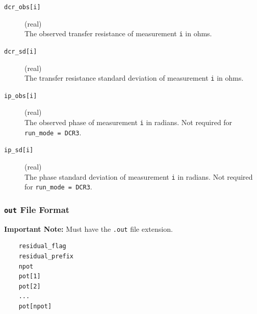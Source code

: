 \documentclass[a4paper,12pt]{article}
\begin{document}
\begin{description}
    \item[\texttt{dcr\_obs[i]}] (real)\hfill \\
    The observed transfer resistance of measurement \texttt{i} in ohms.

    \item[\texttt{dcr\_sd[i]}] (real)\hfill \\
    The transfer resistance standard deviation of measurement \texttt{i} in ohms.

    \item[\texttt{ip\_obs[i]}] (real)\hfill \\
    The observed phase of measurement \texttt{i} in radians. Not required for \texttt{run\_mode = DCR3}.

    \item[\texttt{ip\_sd[i]}] (real)\hfill \\
    The phase standard deviation of measurement \texttt{i} in radians. Not required for \texttt{run\_mode = DCR3}.
\end{description}



\subsubsection{\texttt{out} File Format} \label{forward_out}

\begin{framed}
\noindent \textbf{Important Note:} Must have the \texttt{.out} file extension.
\end{framed}

\begin{framed}
\begin{verbatim}
    residual_flag
    residual_prefix
    npot
    pot[1]
    pot[2]
    ...
    pot[npot]
\end{verbatim}
\end{framed}
\end{document}
